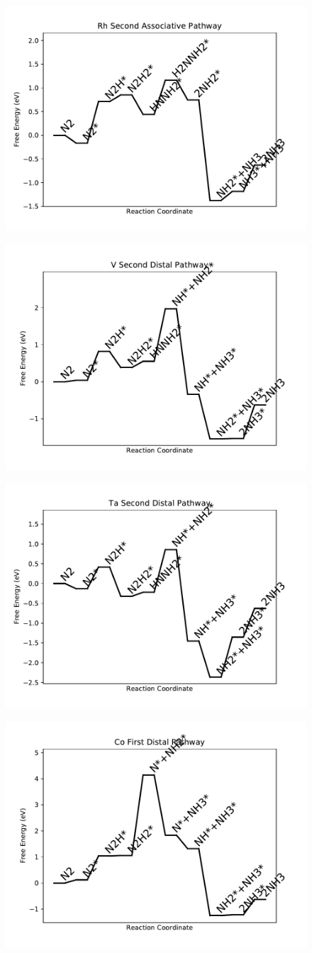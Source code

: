 \documentclass[journal=jacsat,manuscript=article]{achemso}
\begin{document}
\newpage
\begin{figure}
\includegraphics[width=0.5\linewidth]{data/plots/Rh_associative_2.pdf}
\label{fig:Rh_associative_2}
\end{figure}

\begin{figure}
\includegraphics[width=0.5\linewidth]{data/plots/V_distal_2.pdf}
\label{fig:V_distal_2}
\end{figure}

\newpage
\begin{figure}
\includegraphics[width=0.5\linewidth]{data/plots/Ta_distal_2.pdf}
\label{fig:Ta_distal_2}
\end{figure}

\begin{figure}
\includegraphics[width=0.5\linewidth]{data/plots/Co_distal_1.pdf}
\label{fig:Co_distal_1}
\end{figure}
\end{document}
